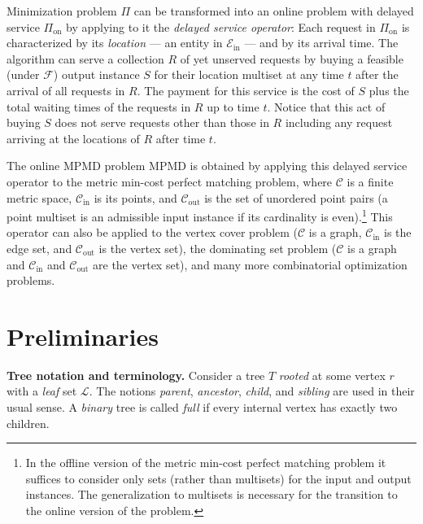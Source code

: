 \documentclass[11pt]{article}
\def\LongVersion{}
\def\LongVersionEnd{}
\def\ShortVersion{}
\def\ShortVersionEnd{}
\renewcommand{\paragraph}[1]{\par\noindent\textbf{#1}}
\theoremstyle{definition}
\theoremstyle{plain}
\theoremstyle{definition}
\theoremstyle{plain}
\theoremstyle{definition}
\theoremstyle{plain}
\newcommand{\Leaves}{\mathcal{L}}
\begin{document}
Minimization problem $\Pi$ can be transformed into an online
problem with delayed service $\Pi_{\text{on}}$ by applying to it the
\emph{delayed service operator}:
Each request in $\Pi_{\text{on}}$ is characterized by its \emph{location} ---
an entity in $\mathcal{E}_{\text{in}}$ ---  and by its arrival time.
The algorithm can serve a collection $R$ of yet unserved requests by buying a
feasible (under $\mathcal{F}$) output instance $S$ for their location multiset
at any time $t$ after the arrival of all requests in $R$.
The payment for this service is the cost of $S$ plus the total waiting times
of the requests in $R$ up to time $t$.
Notice that this act of buying $S$ does not serve requests other than those in
$R$ including any request arriving at the locations of $R$ after time $t$.

\LongVersion %
The online MPMD problem
\LongVersionEnd %
%
\ShortVersion %
MPMD
\ShortVersionEnd %
is obtained by applying this delayed service operator to the
metric min-cost perfect matching problem, where
$\mathcal{C}$ is a finite metric space,
$\mathcal{C}_{\text{in}}$ is its points, and
$\mathcal{C}_{\text{out}}$ is the set of
\LongVersion %
unordered
\LongVersionEnd %
point pairs (a point multiset is an admissible input instance if its
cardinality is even).\footnote{%
In the offline version of the metric min-cost perfect matching problem it
suffices to consider only sets (rather than multisets) for the input and
output instances.
The generalization to multisets is necessary for the transition to the online
version of the problem.
}
This operator can also be applied to
the vertex cover problem
($\mathcal{C}$ is a graph, $\mathcal{C}_{\text{in}}$ is the edge set, and
$\mathcal{C}_{\text{out}}$ is the vertex set),
the dominating set problem
($\mathcal{C}$ is a graph and $\mathcal{C}_{\text{in}}$ and
$\mathcal{C}_{\text{out}}$ are the vertex set),
and many more combinatorial optimization problems.

\section{Preliminaries}
\label{section:preliminaries}

\paragraph{Tree notation and terminology.}
Consider a tree $T$ \emph{rooted} at some vertex $r$ with a \emph{leaf} set
$\Leaves$.
The notions \emph{parent}, \emph{ancestor}, \emph{child}, and \emph{sibling}
are used in their usual sense.
A \emph{binary} tree is called \emph{full} if every internal vertex has
exactly two children.
\end{document}
